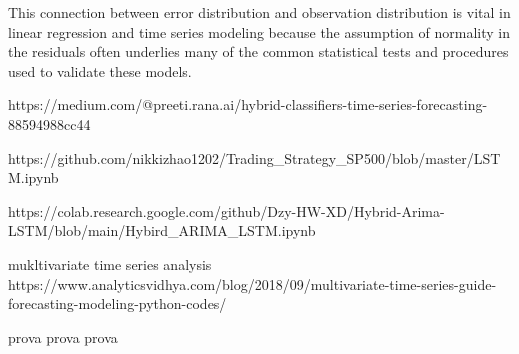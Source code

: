 This connection between error distribution and observation distribution is vital in linear regression and time series modeling because the assumption of normality in the residuals often underlies many of the common statistical tests and procedures used to validate these models.



https://medium.com/@preeti.rana.ai/hybrid-classifiers-time-series-forecasting-88594988cc44


https://github.com/nikkizhao1202/Trading_Strategy_SP500/blob/master/LSTM.ipynb


https://colab.research.google.com/github/Dzy-HW-XD/Hybrid-Arima-LSTM/blob/main/Hybird_ARIMA_LSTM.ipynb

mukltivariate time series analysis 
https://www.analyticsvidhya.com/blog/2018/09/multivariate-time-series-guide-forecasting-modeling-python-codes/


prova
prova
prova